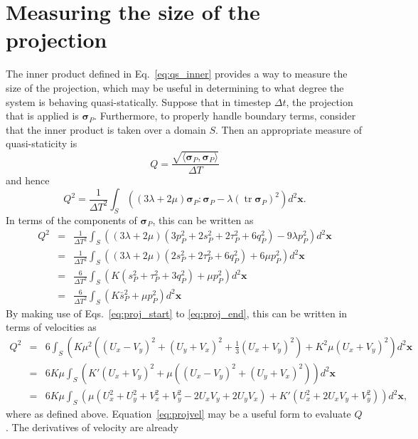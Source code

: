 \documentclass[11pt]{article}
\newcommand{\bsig}{\boldsymbol\sigma}
\renewcommand{\vec}[1]{\mathbf{#1}}
\newcommand{\Dsig}{\bsig_P}
\newcommand{\pdel}{p_P}
\newcommand{\sdel}{s_P}
\newcommand{\qdel}{q_P}
\newcommand{\taudel}{\tau_P}
\DeclareMathOperator{\tr}{tr}
\begin{document}
\section*{Measuring the size of the projection}
The inner product defined in Eq.~\ref{eq:qs_inner} provides a way to measure
the size of the projection, which may be useful in determining to what degree
the system is behaving quasi-statically. Suppose that in timestep $\Delta t$,
the projection that is applied is $\Dsig$. Furthermore, to properly handle
boundary terms, consider that the inner product is taken over a domain $S$. Then an appropriate measure of
quasi-staticity is
\begin{equation}
  Q = \frac{\sqrt{\langle \Dsig, \Dsig\rangle}}{\Delta T}
\end{equation}
and hence
\[
Q^2 = \frac{1}{\Delta T^2} \int_S \left( (3\lambda+2\mu) \Dsig: \Dsig - \lambda (\tr \Dsig)^2 \right) d^2\vec{x}.
\]
In terms of the components of $\Dsig$, this can be written as
\begin{eqnarray}
  Q^2 &=& \frac{1}{\Delta T^2} \int_S \left((3\lambda+2\mu) (3\pdel^2 +2 \sdel^2 + 2\taudel^2 + 6\qdel^2) - 9\lambda \pdel^2 \right) d^2\vec{x} \nonumber \\
  &=& \frac{1}{\Delta T^2} \int_S \left( (3\lambda+2\mu) (2 \sdel^2 + 2\taudel^2 + 6\qdel^2) + 6\mu \pdel^2 \right) d^2\vec{x} \nonumber \\
  &=& \frac{6}{\Delta T^2} \int_S \left( K(\sdel^2+\taudel^2 +3\qdel^2) + \mu \pdel^2 \right) d^2\vec{x} \nonumber \\
  &=& \frac{6}{\Delta T^2} \int_S \left( K\bar{s}_P^2 + \mu \pdel^2 \right) d^2 \vec{x}
\end{eqnarray}
By making use of Eqs.~\ref{eq:proj_start} to \ref{eq:proj_end}, this can be
written in terms of velocities as
\begin{eqnarray}
  Q^2 &=& 6 \int_S \left( K\mu^2 \left( (U_x-V_y)^2 + (U_y+V_x)^2 + \tfrac{1}{3} (U_x+V_y)^2 \right) + K^2\mu (U_x+V_y)^2 \right) d^2\vec{x} \\
  &=& 6K\mu \int_S \left( K'(U_x+V_y)^2 + \mu \left((U_x-V_y)^2 + (U_y+V_x)^2 \right) \right) d^2\vec{x} \\
  &=& 6K\mu \int_S \left( \mu (U_x^2 + U_y^2+ V_x^2 + V_y^2 - 2U_xV_y+2U_yV_x) + K'(U_x^2 + 2U_x V_y + V_y^2) \right) d^2 \vec{x}, \label{eq:projvel}
\end{eqnarray}
where  as defined above. Equation~\ref{eq:projvel}
may be a useful form to evaluate $Q$. The derivatives of velocity are already
\end{document}

